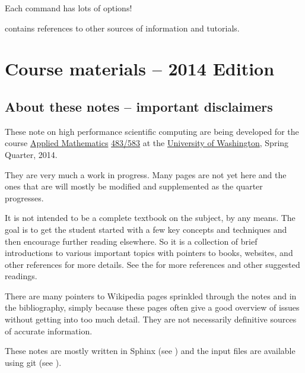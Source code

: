 \documentclass[letterpaper,10pt,english]{sphinxmanual}
\begin{document}
Each command has lots of options!

{\hyperref[biblio:biblio\string-git]{}} contains references to other sources of information and
tutorials.


\chapter{Course materials -- 2014 Edition}
\label{index:course-materials}\label{index:course-materials-2014-edition}

\section{About these notes -- important disclaimers}
\label{about:about-these-notes-important-disclaimers}\label{about:about}\label{about::doc}
These note on high performance scientific computing are being developed for
the course \href{http://www.amath.washington.edu/}{Applied Mathematics} \href{http://www.amath.washington.edu/courses/583-spring-2014/index.html}{483/583}
at the \href{http://www.washington.edu}{University of Washington}, Spring Quarter, 2014.

They are very much a work in progress.  Many pages are not yet here and the
ones that are will mostly be modified and supplemented as the quarter
progresses.

It is not intended to be a complete textbook on the subject, by any means.
The goal is to get the student started with a few key concepts and
techniques and then encourage further reading elsewhere.
So it is a collection of brief introductions to various important topics
with pointers to books, websites, and other references for more details.
See the {\hyperref[biblio:biblio]{}} for more references and other suggested readings.

There are many pointers to Wikipedia pages sprinkled through the notes and
in the bibliography, simply because these pages often give a good overview
of issues without getting into too much detail.  They are not necessarily
definitive sources of accurate information.

These notes are mostly written in Sphinx (see {\hyperref[sphinx:sphinx]{}}) and the input
files are available using git (see {\hyperref[git:classgit]{}}).
\end{document}

